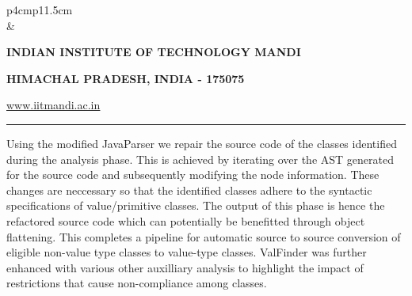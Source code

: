 \documentclass[12 pt, a4paper]{article}
\newcommand{\HRule}{\rule{\linewidth}{1mm}}
\begin{document}
\pagestyle{empty}
\vskip 0.2cm
	\begin{tabular}{p{4cm}p{11.5cm}}
		  \\
		& \centering \large\bf\phantom{Empty line}\\ 
		\rule{0pt}{1pt} \centering \large\bf{INDIAN INSTITUTE OF TECHNOLOGY MANDI} \\
		\rule{0pt}{1pt} \centering \large\bf{HIMACHAL PRADESH, INDIA - 175075} \\
		\rule{0pt}{1pt} \centering \underline{\href{www.iitmandi.ac.in}{www.iitmandi.ac.in}}\\
	\end{tabular}
\noindent

{\raggedleft{}\HRule}

\noindent Using the modified JavaParser we repair the source code of the classes identified 
during the analysis phase. 
This is achieved by iterating over the AST generated for the source code and subsequently modifying the node information. 
These changes are neccessary so that the identified classes adhere to the syntactic specifications of 
value/primitive classes.
The output of this phase is hence the refactored source code which can potentially be benefitted through 
object flattening. This completes a pipeline for automatic source to source conversion of eligible non-value type classes 
to value-type classes.
ValFinder was further enhanced with various other auxilliary analysis to highlight the impact of restrictions that
cause non-compliance among classes.
\end{document}
